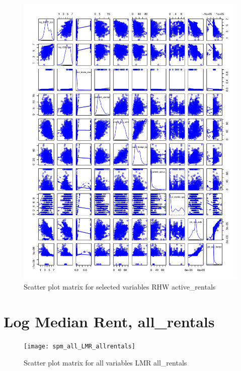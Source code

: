 \documentclass[10pt, letterpaper]{amsart}
\begin{document}
\begin{figure}[H]
  \caption{Scatter plot matrix for selected variables RHW active\_rentals}
  \includegraphics[scale=0.6]{spm_selected_RHW_activerentals}
\end{figure}


\newpage
\section{Log Median Rent, all\_rentals}

\begin{figure}[H]
  \caption{Scatter plot matrix for all variables LMR all\_rentals}
  \texttt{[image: spm\_all\_LMR\_allrentals]}
\end{figure}
\end{document}
